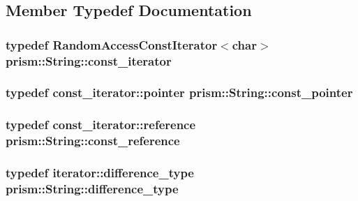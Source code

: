 \subsection{Member Typedef Documentation}
\subsubsection[{\texorpdfstring{const\+\_\+iterator}{const_iterator}}]{\setlength{\rightskip}{0pt plus 5cm}typedef Random\+Access\+Const\+Iterator$<$char$>$ {\bf prism\+::\+String\+::const\+\_\+iterator}}\hypertarget{classprism_1_1_string_a8b46f0fbe9c5c94ba892975242e3ab68}{}\label{classprism_1_1_string_a8b46f0fbe9c5c94ba892975242e3ab68}
\subsubsection[{\texorpdfstring{const\+\_\+pointer}{const_pointer}}]{\setlength{\rightskip}{0pt plus 5cm}typedef const\+\_\+iterator\+::pointer {\bf prism\+::\+String\+::const\+\_\+pointer}}\hypertarget{classprism_1_1_string_adbea4cbf0f4f62948eb2accf7d402456}{}\label{classprism_1_1_string_adbea4cbf0f4f62948eb2accf7d402456}
\subsubsection[{\texorpdfstring{const\+\_\+reference}{const_reference}}]{\setlength{\rightskip}{0pt plus 5cm}typedef const\+\_\+iterator\+::reference {\bf prism\+::\+String\+::const\+\_\+reference}}\hypertarget{classprism_1_1_string_a7825c62cb2047e36ec704a17ef94f299}{}\label{classprism_1_1_string_a7825c62cb2047e36ec704a17ef94f299}
\subsubsection[{\texorpdfstring{difference\+\_\+type}{difference_type}}]{\setlength{\rightskip}{0pt plus 5cm}typedef iterator\+::difference\+\_\+type {\bf prism\+::\+String\+::difference\+\_\+type}}\hypertarget{classprism_1_1_string_a50fc3d423db1d24c511b28b24e4a7c00}{}\label{classprism_1_1_string_a50fc3d423db1d24c511b28b24e4a7c00}
